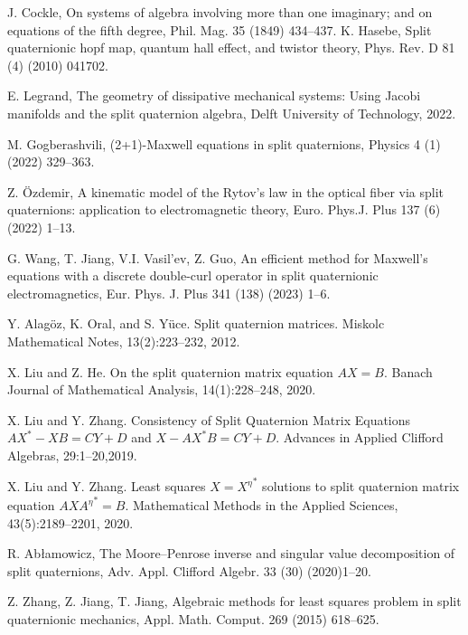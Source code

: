 \documentclass[12pt]{article}
\numberwithin{equation}{section} %
\begin{document}
\begin{thebibliography}{99}

 J. Cockle, On systems of algebra involving more than one imaginary; and on equations of the fifth degree, Phil. Mag. 35 (1849) 434–437.
 K. Hasebe, Split quaternionic hopf map, quantum hall effect, and twistor theory, Phys. Rev. D 81 (4) (2010) 041702.

 E. Legrand, The geometry of dissipative mechanical systems: Using Jacobi manifolds and the split quaternion algebra, Delft University of
Technology, 2022.

 M. Gogberashvili, (2+1)-Maxwell equations in split quaternions, Physics 4 (1) (2022) 329–363.

 Z. Özdemir, A kinematic model of the Rytov’s law in the optical fiber via split quaternions: application to electromagnetic theory, Euro. Phys.J. Plus 137 (6) (2022) 1–13.

 G. Wang, T. Jiang, V.I. Vasil’ev, Z. Guo, An efficient method for Maxwell’s equations with a discrete double-curl operator in split quaternionic
electromagnetics, Eur. Phys. J. Plus 341 (138) (2023) 1–6.

 Y. Alag\"oz, K. Oral, and S. Y\"uce. Split quaternion matrices. Miskolc
Mathematical Notes, 13(2):223–232, 2012.

 X. Liu and Z. He. On the split quaternion matrix equation $AX= B$. Banach Journal
of Mathematical Analysis, 14(1):228–248, 2020.

 X. Liu and Y. Zhang. Consistency of Split Quaternion Matrix Equations $AX^* - XB = CY + D$ and $X - AX^*B = CY + D$. Advances in Applied Clifford Algebras, 29:1–20,2019.

 X. Liu and Y. Zhang. Least squares \(X = {X^{\eta}}^* \) solutions to split quaternion matrix equation \(AX{A^{\eta}}^*= B\). Mathematical Methods in the Applied Sciences, 43(5):2189–2201, 2020.

 R. Abłamowicz, The Moore–Penrose inverse and singular value decomposition of split quaternions, Adv. Appl. Clifford Algebr. 33 (30) (2020)1–20.

 Z. Zhang, Z. Jiang, T. Jiang, Algebraic methods for least squares problem in split quaternionic mechanics, Appl. Math. Comput. 269 (2015) 618–625.


\end{thebibliography}
\end{document}
